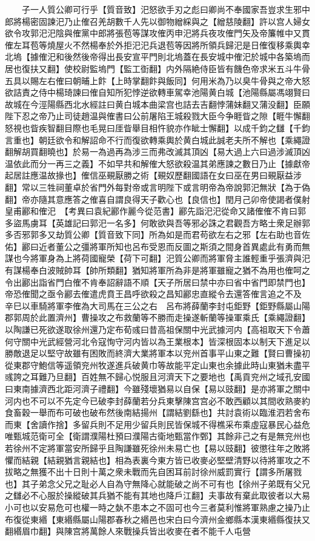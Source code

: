 　　子一人質公卿可行乎【質音致】汜怒欲手刃之彪曰卿尚不奉國家吾豈求生邪中郎將楊密固諫汜乃止傕召羌胡數千人先以御物繒綵與之【繒慈陵翻】許以宫人婦女欲令攻郭汜汜陰與傕黨中郎將張苞等謀攻傕丙申汜將兵夜攻傕門矢及帝簾帷中又貫傕左耳苞等燒屋火不然楊奉於外拒汜汜兵退苞等因將所領兵歸汜是日傕復移乘輿幸北塢【據傕汜和後然後帝得出長安宣平門則北塢蓋在長安城中傕汜於城中各築塢而居也復扶又翻】使校尉監塢門【監工衘翻】内外隔絶侍臣皆有饑色帝求米五斗牛骨五具以賜左右傕曰朝晡上飰【上時掌翻飰與飯同】何用米為乃以臭牛骨與之帝大怒欲詰責之侍中楊琦諫曰傕自知所犯悖逆欲轉車駕幸池陽黄白城【池陽縣屬馮翊賢曰故城在今涇陽縣西北水經註曰黄白城本曲梁宫也詰去吉翻悖蒲妹翻又蒲没翻】臣願陛下忍之帝乃止司徒趙温與傕書曰公前屠陷王城殺戮大臣今争睚眥之隙【睚牛懈翻怒視也眥疾智翻目際也毛晃曰厓眥舉目相忤貌亦作眦士懈翻】以成千鈞之讎【千鈞言重也】朝廷欲令和解詔命不行而復欲轉乘輿於黄白城此誠老夫所不解也【乘繩證翻解胡買翻曉也】於易一為過再為涉三而弗改滅其頂凶【易大過上六曰過涉滅頂凶温依此而分一再三之義】不如早共和解傕大怒欲殺温其弟應諫之數日乃止【據獻帝起居註應温故掾也】傕信巫覡厭勝之術【覡奴歷翻國語在女曰巫在男曰覡厭益涉翻】常以三牲祠董卓於省門外每對帝或言明陛下或言明帝為帝說郭汜無狀【為于偽翻】帝亦隨其意應答之傕喜自謂良得天子歡心也【良信也】閏月己卯帝使謁者僕射皇甫酈和傕汜　【考異曰袁紀酈作麗今從范書】酈先詣汜汜從命又諸傕傕不肯曰郭多盜馬虜耳【英雄記曰郭汜一名多】何敢欲與吾等邪必誅之君觀吾方略士衆足辦郭多否邪郭多又劫質公卿【質音致下同】所為如是而君苟欲左右之邪【左右助也音佐佑】酈曰近者董公之彊將軍所知也呂布受恩而反圖之斯須之間身首異處此有勇而無謀也今將軍身為上將荷國寵榮【荷下可翻】汜質公卿而將軍脅主誰輕重乎張濟與汜有謀楊奉白波賊帥耳【帥所類翻】猶知將軍所為非是將軍雖寵之猶不為用也傕呵之令出酈出詣省門白傕不肯奉詔辭語不順【天子所居曰禁中亦曰省中省門即禁門也】帝恐傕聞之亟令酈去傕遣虎賁王昌呼欲殺之昌知酈忠直縱令去還答傕言追之不及　辛巳以車騎將軍李傕為大司馬在三公之右　呂布將薛蘭李封屯鉅野【鉅野縣屬山陽郡郭周於此置濟州】曹操攻之布救蘭等不勝而走操遂斬蘭等操軍乘氏【乘繩證翻】以陶謙已死欲遂取徐州還乃定布荀彧曰昔高祖保關中光武據河内【高祖取天下令蕭何守關中光武經營河北令寇恂守河内皆以為王業根本】皆深根固本以制天下進足以勝敵退足以堅守故雖有困敗而終濟大業將軍本以兖州首事平山東之難【賢曰曹操初從東郡守鮑信等遥領兖州牧遂進兵破黄巾等故能平定山東也余據此時山東猶未盡平彧誇之耳難乃旦翻】百姓無不歸心悦服且河濟天下之要地也【禹貢兖州之域孔安國曰東南據濟西北距河濟子禮翻】今雖殘壞猶易以自保【易以豉翻】是亦將軍之關中河内也不可以不先定今已破李封薛蘭若分兵東擊陳宫宫必不敢西顧以其間收熟麥約食畜穀一舉而布可破也破布然後南結揚州【謂結劉繇也】共討袁術以臨淮泗若舍布而東【舍讀作捨】多留兵則不足用少留兵則民皆保城不得樵采布乘虛寇暴民心益危唯甄城范衛可全【衛謂濮陽杜預曰濮陽古衛地甄當作鄄】其餘非己之有是無兖州也若徐州不定將軍當安所歸乎且陶謙雖死徐州未易亡也【易以豉翻】彼懲往年之敗將懼而結親【結親猶言親結也】相為表裏今東方皆已收麥必堅壁清野以待將軍攻之不拔略之無獲不出十日則十萬之衆未戰而先自困耳前討徐州威罰實行【謂多所屠戮也】其子弟念父兄之耻必人自為守無降心就能破之尚不可有也【徐州子弟既有父兄之讎必不心服於操縱破其兵猶不能有其地也降戶江翻】夫事故有棄此取彼者以大易小可也以安易危可也權一時之埶不患本之不固可也今三者莫利惟將軍熟慮之操乃止布復從東緡【東緡縣屬山陽郡春秋之緡邑也宋白曰今濟州金鄉縣本漢東緡縣復扶又翻緡眉巾翻】與陳宫將萬餘人來戰操兵皆出收麥在者不能千人屯營